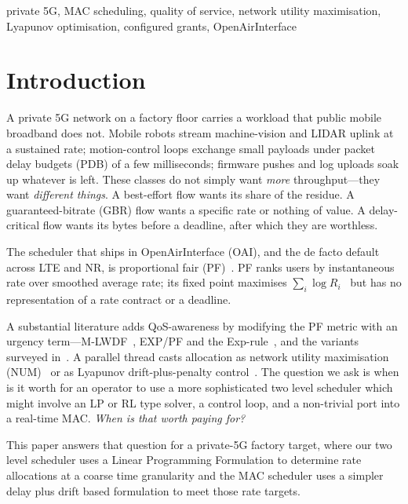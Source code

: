 \documentclass[conference]{IEEEtran}
\begin{document}
\begin{IEEEkeywords}
private 5G, MAC scheduling, quality of service, network utility
maximisation, Lyapunov optimisation, configured grants, OpenAirInterface
\end{IEEEkeywords}

\section{Introduction}

A private 5G network on a factory floor carries a workload that public
mobile broadband does not. Mobile robots stream machine-vision and LIDAR
uplink at a sustained rate; motion-control loops exchange small payloads
under packet delay budgets (PDB) of a few milliseconds; firmware pushes and
log uploads soak up whatever is left. These classes do not simply want
\emph{more} throughput---they want \emph{different things}. A best-effort
flow wants its share of the residue. A guaranteed-bitrate (GBR) flow wants
a specific rate or nothing of value. A delay-critical flow wants its bytes
before a deadline, after which they are worthless.

The scheduler that ships in OpenAirInterface (OAI), and the de facto
default across LTE and NR, is proportional fair (PF)~\cite{jalali2000}.
PF ranks users by instantaneous rate over smoothed average rate; its fixed
point maximises $\sum_i \log R_i$~\cite{kelly1998} but has no representation of a
rate contract or a deadline.

A substantial literature adds QoS-awareness by modifying the PF metric with
an urgency term---M-LWDF~\cite{andrews2001}, EXP/PF and the
Exp-rule~\cite{shakkottai2002}, and the variants surveyed
in~\cite{capozzi2013}. A parallel thread casts allocation as network
utility maximisation (NUM)~\cite{kelly1998} or as Lyapunov drift-plus-penalty
control~\cite{neely2010,tassiulas1992,stolyar2005}. The question we ask is when is 
it worth for an operator to use a more sophisticated two level scheduler which
might involve an LP or RL type solver, a control loop, and a
non-trivial port into a real-time MAC. \emph{When is that worth paying
for?}

This paper answers that question for a private-5G factory target, where our two level
scheduler uses a Linear Programming Formulation to determine rate allocations
at a coarse time granularity and the MAC scheduler uses a simpler delay plus drift
based formulation to meet those rate targets.
\end{document}
